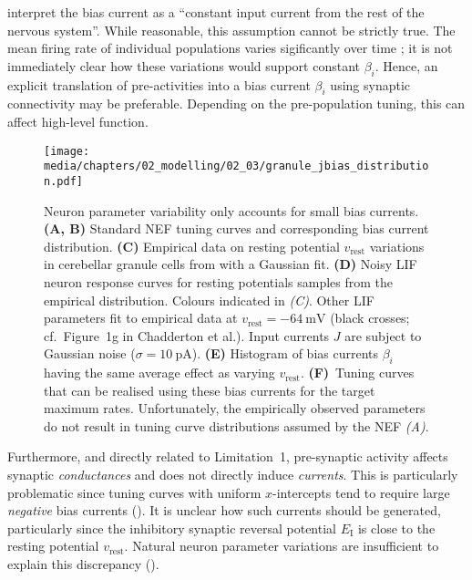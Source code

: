  interpret the bias current as a \enquote{constant input current from the rest of the nervous system}.
While reasonable, this assumption cannot be strictly true.
The mean firing rate of individual populations varies sigificantly over time \citep{okun2012population}; it is not immediately clear how these variations would support constant $\beta_i$.
Hence, an explicit translation of pre-activities into a bias current $\beta_i$ using synaptic connectivity may be preferable.
Depending on the pre-population tuning, this can affect high-level function.


\begin{figure}
	\texttt{[image: media/chapters/02\_modelling/02\_03/granule\_jbias\_distribution.pdf]}%
	{\label{fig:jbias_a}}%
	{\label{fig:jbias_b}}%
	{\label{fig:jbias_c}}%
	{\label{fig:jbias_d}}%
	{\label{fig:jbias_e}}%
	{\label{fig:jbias_f}}
	\caption[Neuron parameter variability only accounts for small bias currents]{Neuron parameter variability only accounts for small bias currents.
	\textbf{(A, B)} Standard NEF tuning curves and corresponding bias current distribution.
	\textbf{(C)} Empirical data on resting potential $v_\mathrm{rest}$ variations in cerebellar granule cells from \citet[Figure~1b]{chadderton2004integration} with a Gaussian fit.
	\textbf{(D)} Noisy LIF neuron response curves for resting potentials samples from the empirical distribution. Colours indicated in \emph{(C)}. Other LIF parameters fit to empirical data at $v_\mathrm{rest} = \SI{-64}{\milli\volt}$ (black crosses; cf.~Figure~1g in Chadderton et al.). Input currents $J$ are subject to Gaussian noise ($\sigma = \SI{10}{\pico\ampere}$). \textbf{(E)} Histogram of bias currents $\beta_i$ having the same average effect as varying $v_\mathrm{rest}$.
	\textbf{(F)}~Tuning curves that can be realised using these bias currents for the target maximum rates.
	Unfortunately, the empirically observed parameters do not result in tuning curve distributions assumed by the NEF \emph{(A)}.}
	\vspace*{-0.5em}
\end{figure}

Furthermore, and directly related to Limitation~1, pre-synaptic activity affects synaptic \emph{conductances} and does not directly induce \emph{currents}.
This is particularly problematic since tuning curves with uniform $x$-intercepts tend to require large \emph{negative} bias currents ().
It is unclear how such currents should be generated, particularly since the inhibitory synaptic reversal potential $E_\mathrm{I}$ is close to the resting potential $v_\mathrm{rest}$.
Natural neuron parameter variations are insufficient to explain this discrepancy ().

